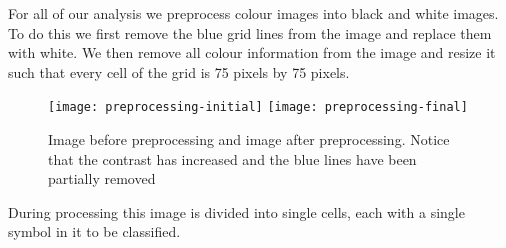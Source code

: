 For all of our analysis we preprocess colour images into black and white
images. To do this we first remove the blue grid lines from the image and
replace them with white. We then remove all colour information from the image
and resize it such that every cell of the grid is 75 pixels by 75 pixels.

\begin{figure}[h]
    \begin{center}
    \texttt{[image: preprocessing-initial]}
    \texttt{[image: preprocessing-final]}
    \caption{Image before preprocessing and image after preprocessing. Notice
        that the contrast has increased and the blue lines have been partially
        removed}
    \end{center}
\end{figure}

During processing this image is divided into single cells, each with a single symbol
in it to be classified.
